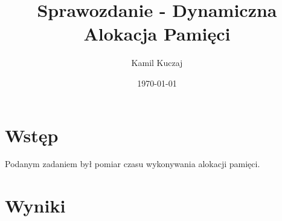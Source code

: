 \documentclass[11pt, a4paper]{article}
\author{Kamil Kuczaj}
\date{\today}
\title{Sprawozdanie - Dynamiczna Alokacja Pamięci}
\begin{document}
\maketitle

\section{Wstęp}
Podanym zadaniem był pomiar czasu wykonywania alokacji pamięci.

\section{Wyniki}
\end{document}
